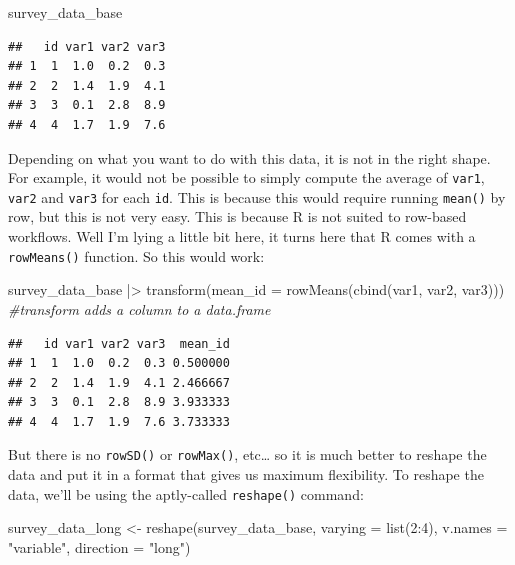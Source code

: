 \documentclass[
]{article}
\newenvironment{Shaded}{\begin{snugshade}}{\end{snugshade}}
\newcommand{\AttributeTok}[1]{\textcolor[rgb]{0.77,0.63,0.00}{#1}}
\newcommand{\CommentTok}[1]{\textcolor[rgb]{0.56,0.35,0.01}{\textit{#1}}}
\newcommand{\DecValTok}[1]{\textcolor[rgb]{0.00,0.00,0.81}{#1}}
\newcommand{\FunctionTok}[1]{\textcolor[rgb]{0.00,0.00,0.00}{#1}}
\newcommand{\NormalTok}[1]{#1}
\newcommand{\OtherTok}[1]{\textcolor[rgb]{0.56,0.35,0.01}{#1}}
\newcommand{\SpecialCharTok}[1]{\textcolor[rgb]{0.00,0.00,0.00}{#1}}
\newcommand{\StringTok}[1]{\textcolor[rgb]{0.31,0.60,0.02}{#1}}
\begin{document}
\begin{Shaded}
\begin{Highlighting}[]
\NormalTok{survey\_data\_base}
\end{Highlighting}
\end{Shaded}

\begin{verbatim}
##   id var1 var2 var3
## 1  1  1.0  0.2  0.3
## 2  2  1.4  1.9  4.1
## 3  3  0.1  2.8  8.9
## 4  4  1.7  1.9  7.6
\end{verbatim}

Depending on what you want to do with this data, it is not in the right shape. For example, it
would not be possible to simply compute the average of \texttt{var1}, \texttt{var2} and \texttt{var3} for each \texttt{id}.
This is because this would require running \texttt{mean()} by row, but this is not very easy. This is
because R is not suited to row-based workflows. Well I'm lying a little bit here, it turns here
that R comes with a \texttt{rowMeans()} function. So this would work:

\begin{Shaded}
\begin{Highlighting}[]
\NormalTok{survey\_data\_base }\SpecialCharTok{|\textgreater{}}
  \FunctionTok{transform}\NormalTok{(}\AttributeTok{mean\_id =} \FunctionTok{rowMeans}\NormalTok{(}\FunctionTok{cbind}\NormalTok{(var1, var2, var3))) }\CommentTok{\#transform adds a column to a data.frame}
\end{Highlighting}
\end{Shaded}

\begin{verbatim}
##   id var1 var2 var3  mean_id
## 1  1  1.0  0.2  0.3 0.500000
## 2  2  1.4  1.9  4.1 2.466667
## 3  3  0.1  2.8  8.9 3.933333
## 4  4  1.7  1.9  7.6 3.733333
\end{verbatim}

But there is no \texttt{rowSD()} or \texttt{rowMax()}, etc\ldots{} so it is much better to reshape the data and put it in a
format that gives us maximum flexibility. To reshape the data, we'll be using the aptly-called \texttt{reshape()} command:

\begin{Shaded}
\begin{Highlighting}[]
\NormalTok{survey\_data\_long }\OtherTok{\textless{}{-}} \FunctionTok{reshape}\NormalTok{(survey\_data\_base,}
        \AttributeTok{varying =} \FunctionTok{list}\NormalTok{(}\DecValTok{2}\SpecialCharTok{:}\DecValTok{4}\NormalTok{), }\AttributeTok{v.names =} \StringTok{"variable"}\NormalTok{, }\AttributeTok{direction =} \StringTok{"long"}\NormalTok{)}
\end{Highlighting}
\end{Shaded}
\end{document}
